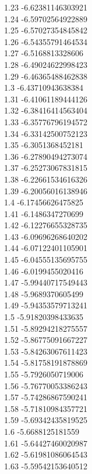 {1.23	-6.62381146303921\\
1.24	-6.59702564922889\\
1.25	-6.57027354845842\\
1.26	-6.54355791464534\\
1.27	-6.5168813328606\\
1.28	-6.49024622998423\\
1.29	-6.46365488462838\\
1.3	-6.43710943638384\\
1.31	-6.41061189444126\\
1.32	-6.38416414563404\\
1.33	-6.35776796194572\\
1.34	-6.33142500752123\\
1.35	-6.3051368452181\\
1.36	-6.27890494273074\\
1.37	-6.25273067831815\\
1.38	-6.22661534616326\\
1.39	-6.20056016138946\\
1.4	-6.17456626475825\\
1.41	-6.1486347270699\\
1.42	-6.12276655328735\\
1.43	-6.09696268640202\\
1.44	-6.07122401105901\\
1.45	-6.04555135695755\\
1.46	-6.0199455020416\\
1.47	-5.99440717549443\\
1.48	-5.9689370605499\\
1.49	-5.94353579713241\\
1.5	-5.91820398433635\\
1.51	-5.89294218275557\\
1.52	-5.86775091667227\\
1.53	-5.84263067611423\\
1.54	-5.81758191878869\\
1.55	-5.7926050719006\\
1.56	-5.76770053386243\\
1.57	-5.74286867590241\\
1.58	-5.71810984357721\\
1.59	-5.69342435819525\\
1.6	-5.6688125181559\\
1.61	-5.64427460020987\\
1.62	-5.61981086064543\\
1.63	-5.59542153640512\\
}
